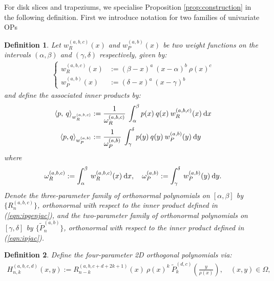 \documentclass[11pt, oneside]{article}   	%
\newcommand{\hdop}{H}
\newcommand{\hdopnk}{\hdop_{n,k}}
\newcommand{\jac}{{\tilde P}}
\newcommand{\genjac}{R}
\newcommand{\genjacnmk}{\genjac_{n-k}}
\newcommand{\genjacw}{w_\genjac}
\newcommand{\jacw}{w_P}
\newcommand{\normgenjac}{\omega_\genjac}
\newcommand{\normjac}{\omega_P}
\newtheorem{definition}{Definition}
\begin{document}
For disk slices and trapeziums, we specialise Proposition \ref{prop:construction} in the following definition. First we introduce notation for two families of univariate OPs
\begin{definition}\label{def:OPconstruction}
Let $\genjacw^{(a,b,c)}(x)$ and $\jacw^{(a,b)}(x)$ be two weight functions on the intervals $(\alpha, \beta)$ and $(\gamma, \delta)$ respectively, given by:
\begin{align*}
\begin{cases}
\genjacw^{(a,b,c)}(x) &:= (\beta - x)^a \: (x - \alpha)^{b} \: \rho(x)^{c} \\
\jacw^{(a,b)}(x) &:= (\delta-x)^a \: (x - \gamma)^b
\end{cases}
\end{align*}
and define the associated inner products by:
\begin{align}
	\ip< p, \: q >_{\genjacw^{(a,b,c)}} &:= \frac{1}{\normgenjac^{(a,b,c)}} \: \int_\alpha^\beta p(x) \: q(x) \: \genjacw^{(a,b,c)}(x) \: \D x \label{eqn:ipgenjac} \\
	\ip<p, q>_{\jacw^{(a,b)}} &:= \frac{1}{\normjac^{(a,b)}} \: \int_\gamma^\delta p(y) \: q(y) \: \jacw^{(a,b)}(y)\: \D y \label{eqn:ipjac}
\end{align}
where
\begin{align}
	\normgenjac^{(a,b,c)} := \int_\alpha^\beta \: \genjacw^{(a,b,c)}(x) \: \D x, \quad \normjac^{(a,b)} := \int_\gamma^\delta \: \jacw^{(a,b)}(y) \: \D y. \label{eqn:ipnormalisations}
\end{align}
Denote the three-parameter family of orthonormal polynomials on $[\alpha,\beta]$ by $\{\genjac_n^{(a,b,c)}\}$, orthonormal with respect to the inner product defined in (\ref{eqn:ipgenjac}), and the two-parameter family of orthonormal polynomials on $[\gamma,\delta]$ by $\{\jac_n^{(a,b)}\}$, orthonormal with respect to the inner product defined in (\ref{eqn:ipjac}).
\end{definition}

\begin{definition}\label{def:constuction}
Define the four-parameter 2D orthogonal polynomials via:
\begin{align*}
	\hdopnk^{(a,b,c,d)}(x,y) := \genjacnmk^{(a, b, c+d+2k+1)}(x) \: \rho(x)^k \: \jac_k^{(d,c)}(\frac{y}{\rho(x)}), \quad (x,y) \in \Omega, 
\end{align*}
\end{definition}
\end{document}
